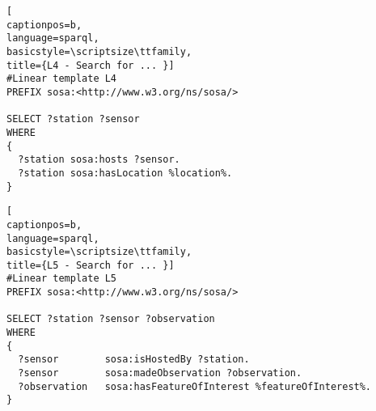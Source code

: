 \newpage
\begin{lstlisting}[
captionpos=b, 
language=sparql,
basicstyle=\scriptsize\ttfamily,
title={L4 - Search for ... }]
#Linear template L4
PREFIX sosa:<http://www.w3.org/ns/sosa/>

SELECT ?station ?sensor 
WHERE 
{
  ?station sosa:hosts ?sensor.
  ?station sosa:hasLocation %location%.
}
\end{lstlisting}
\begin{lstlisting}[
captionpos=b, 
language=sparql,
basicstyle=\scriptsize\ttfamily,
title={L5 - Search for ... }]
#Linear template L5
PREFIX sosa:<http://www.w3.org/ns/sosa/>

SELECT ?station ?sensor ?observation
WHERE 
{
  ?sensor        sosa:isHostedBy ?station.
  ?sensor        sosa:madeObservation ?observation.
  ?observation   sosa:hasFeatureOfInterest %featureOfInterest%.
}
\end{lstlisting}
